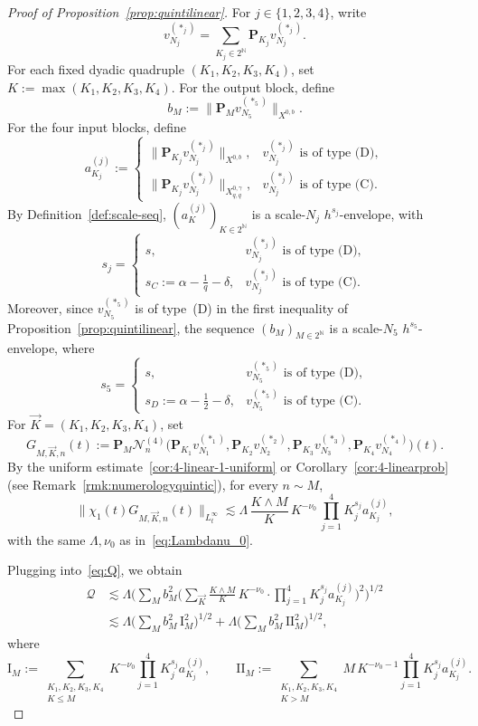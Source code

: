 \documentclass[10pt,a4paper]{amsart}
\newcommand{\N}{\mathbb{N}}
\begin{document}
\begin{proof}[Proof of Proposition~\ref{prop:quintilinear}]
For $j\in\{1,2,3,4\}$, write
\[
v_{N_j}^{(\ast_j)}
=
\sum_{K_j\in 2^{\N}}\mathbf{P}_{K_j}v_{N_j}^{(\ast_j)}.
\]
For each fixed dyadic quadruple $(K_1,K_2,K_3,K_4)$, set $K:=\max(K_1,K_2,K_3,K_4)$.
For the output block, define
\[
b_M:=\|\mathbf{P}_M v_{N_5}^{(\ast_5)}\|_{X^{0,b}}.
\]
For the four input blocks, define
\[
a_{K_j}^{(j)}
:=
\begin{cases}
	\|\mathbf{P}_{K_j}v_{N_j}^{(\ast_j)}\|_{X^{0,b}},
	& v_{N_j}^{(\ast_j)} \text{ is of type (D)},\\[1mm]
	\|\mathbf{P}_{K_j}v_{N_j}^{(\ast_j)}\|_{X_{q,q}^{0,\gamma}},
	& v_{N_j}^{(\ast_j)} \text{ is of type (C)}.
\end{cases}
\]
By Definition~\ref{def:scale-seq}, $(a_K^{(j)})_{K\in 2^{\N}}$ is a scale-$N_j$ $h^{s_j}$-envelope, with
\[
s_j=
\begin{cases}
	s,& v_{N_j}^{(\ast_j)} \text{ is of type (D)},\\
	s_C:=\alpha-\frac1q-\delta,& v_{N_j}^{(\ast_j)} \text{ is of type (C)}.
\end{cases}
\]
Moreover, since $v_{N_5}^{(\ast_5)}$ is of type~(D) in the first inequality of
Proposition~\ref{prop:quintilinear}, the sequence $(b_M)_{M\in 2^{\N}}$ is a scale-$N_5$ $h^{s_5}$-envelope, where
\[
s_5=\begin{cases}
	s,& v_{N_5}^{(\ast_5)} \text{ is of type (D)},\\
	s_D:=\alpha-\frac12-\delta,& v_{N_5}^{(\ast_5)} \text{ is of type (C)}.
\end{cases}
\]
For $\vec{K}=(K_1,K_2,K_3,K_4)$, set
\[
G_{M,\vec{K},n}(t):=\mathbf{P}_M\mathcal{N}_n^{(4)}
\big(
\mathbf{P}_{K_1}v_{N_1}^{(\ast_1)},
\mathbf{P}_{K_2}v_{N_2}^{(\ast_2)},
\mathbf{P}_{K_3}v_{N_3}^{(\ast_3)},
\mathbf{P}_{K_4}v_{N_4}^{(\ast_4)}
\big)(t).
\]
By the uniform estimate~\eqref{cor:4-linear-1-uniform} or Corollary~\ref{cor:4-linearprob} (see Remark~\ref{rmk:numerologyquintic}),
for every $n\sim M$,
\begin{equation}\label{eq:blockwise-pointwise-case2}
	\|\chi_1(t) G_{M,\vec{K},n}(t)\|_{L_t^\infty}
	\lesssim
	\Lambda\,\frac{K\wedge M}{K}\,
	K^{-\nu_0}\,
	\prod_{j=1}^4 K_j^{s_j}a_{K_j}^{(j)},
\end{equation}
with the same $\Lambda,\nu_0$ as in~\eqref{eq:Lambdanu_0}.

Plugging into~\eqref{eq:Q}, we obtain
\begin{align*}
	\mathcal{Q}&\lesssim \Lambda\Big(\sum_{M}b_M^2\Big(\sum_{\vec{K}}\frac{K\wedge M}{K}\, K^{-\nu_0}\cdot\prod_{j=1}^4 K_j^{s_j}a_{K_j}^{(j)}
	\Big)^2\Big)^{1/2}\\
	&\lesssim \Lambda
	\Big(\sum_{M}b_M^2\,\mathrm{I}_M^2\Big)^{1/2}+\Lambda
	\Big(\sum_{M}b_M^2\,\mathrm{II}_M^2\Big)^{1/2},
\end{align*}
where
\[
\mathrm{I}_M:=\sum_{\substack{K_1,K_2,K_3,K_4\\
		K\leq M
}} K^{-\nu_0}\prod_{j=1}^4 K_j^{s_j}a_{K_j}^{(j)},\qquad \mathrm{II}_M:=\sum_{\substack{K_1,K_2,K_3,K_4\\
		K> M
}} M\, K^{-\nu_0-1}\prod_{j=1}^4 K_j^{s_j}a_{K_j}^{(j)}.
\]


\end{proof}
\end{document}
